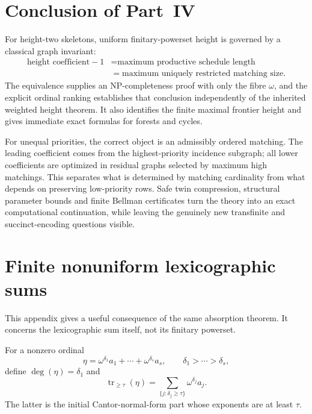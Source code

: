 \documentclass[11pt,a4paper]{article}
\theoremstyle{definition}
\theoremstyle{remark}
\newcommand{\tr}{\operatorname{tr}}
\newcounter{nhurSavedEq}
\begin{document}
\section{Conclusion of Part~IV}\label{nh:ur:sec:conclusion}
\setcounter{equation}{0}

For height-two skeletons, uniform finitary-powerset height is governed by a
classical graph invariant:
\[
 \begin{aligned}
 \text{height coefficient}-1
   &=\text{maximum productive schedule length}\\
   &=\text{maximum uniquely restricted matching size}.
 \end{aligned}
\]
The equivalence supplies an NP-completeness proof with only the fibre
$\omega$, and the explicit ordinal ranking establishes that conclusion
independently of the inherited weighted height theorem. It also identifies
the finite maximal frontier height and gives immediate exact formulas for
forests and cycles.

For unequal priorities, the correct object is an admissibly ordered matching.
The leading coefficient comes from the highest-priority incidence subgraph;
all lower coefficients are optimized in residual graphs selected by maximum
high matchings. This separates what is determined by matching cardinality
from what depends on preserving low-priority rows. Safe twin compression,
structural parameter bounds and finite Bellman certificates turn the theory
into an exact computational continuation, while leaving the genuinely new
transfinite and succinct-encoding questions visible.

\setcounter{equation}{\value{nhurSavedEq}}
\let\theequation\nhurSavedTheequation
\let\theHequation\nhurSavedTheHequation

\clearpage
{}
\appendix
\section{Finite nonuniform lexicographic sums}\label{sec:lex}

This appendix gives a useful consequence of the same absorption theorem.
It concerns the lexicographic sum itself, not its finitary powerset.

For a nonzero ordinal
\[
 \eta=\omega^{\delta_1}a_1+\cdots+\omega^{\delta_s}a_s,
 \qquad \delta_1>\cdots>\delta_s,
\]
define $\deg(\eta)=\delta_1$ and
\[
 \tr_{\ge\tau}(\eta)
     =\sum_{\{j:\delta_j\ge\tau\}}\omega^{\delta_j}a_j.
\]
The latter is the initial Cantor-normal-form part whose exponents are at
least $\tau$.
\end{document}
